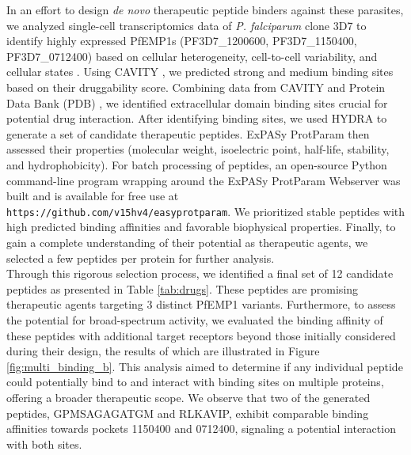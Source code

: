 In an effort to design \textit{de novo} therapeutic peptide binders against these parasites, we analyzed single-cell transcriptomics data of \textit{P. falciparum} clone 3D7 to identify highly expressed PfEMP1s (PF3D7\_1200600, PF3D7\_1150400, PF3D7\_0712400) based on cellular heterogeneity, cell-to-cell variability, and cellular states \cite{choudhuri2024computational}. Using CAVITY \cite{Yuan2013}, we predicted strong and medium binding sites based on their druggability score. Combining data from CAVITY and Protein Data Bank (PDB) \cite{Berman2000}, we identified extracellular domain binding sites crucial for potential drug interaction. After identifying binding sites, we used HYDRA to generate a set of candidate therapeutic peptides. ExPASy ProtParam \cite{gasteiger2003expasy} then assessed their properties (molecular weight, isoelectric point, half-life, stability, and hydrophobicity). For batch processing of peptides, an open-source Python command-line program wrapping around the ExPASy ProtParam Webserver was built and is available for free use at \texttt{https://github.com/v15hv4/easyprotparam}. We prioritized stable peptides with high predicted binding affinities and favorable biophysical properties. Finally, to gain a complete understanding of their potential as therapeutic agents, we selected a few peptides per protein for further analysis. \\

Through this rigorous selection process, we identified a final set of 12 candidate peptides as presented in Table \ref{tab:drugs}. These peptides are promising therapeutic agents targeting 3 distinct PfEMP1 variants. Furthermore, to assess the potential for broad-spectrum activity, we evaluated the binding affinity of these peptides with additional target receptors beyond those initially considered during their design, the results of which are illustrated in Figure \ref{fig:multi_binding_b}. This analysis aimed to determine if any individual peptide could potentially bind to and interact with binding sites on multiple proteins, offering a broader therapeutic scope. We observe that two of the generated peptides, GPMSAGAGATGM and RLKAVIP, exhibit comparable binding affinities towards pockets 1150400 and 0712400, signaling a potential interaction with both sites. \\

